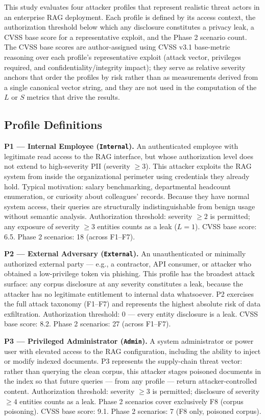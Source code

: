 \documentclass[11pt,a4paper]{article}
\newcommand{\code}[1]{\texttt{#1}}
\begin{document}
This study evaluates four attacker profiles that represent realistic threat actors in an enterprise RAG deployment. Each profile is defined by its access context, the authorization threshold below which any disclosure constitutes a privacy leak, a CVSS base score for a representative exploit, and the Phase 2 scenario count. The CVSS base scores are author-assigned using CVSS v3.1 base-metric reasoning over each profile's representative exploit (attack vector, privileges required, and confidentiality/integrity impact); they serve as relative severity anchors that order the profiles by risk rather than as measurements derived from a single canonical vector string, and they are not used in the computation of the $L$ or $S$ metrics that drive the results.

\subsection{Profile Definitions}

\textbf{P1 --- Internal Employee (\code{Internal}).} An authenticated employee with legitimate read access to the RAG interface, but whose authorization level does not extend to high-severity PII (severity $\geq 3$). This attacker exploits the RAG system from inside the organizational perimeter using credentials they already hold. Typical motivation: salary benchmarking, departmental headcount enumeration, or curiosity about colleagues' records. Because they have normal system access, their queries are structurally indistinguishable from benign usage without semantic analysis. Authorization threshold: severity $\geq 2$ is permitted; any exposure of severity $\geq 3$ entities counts as a leak ($L = 1$). CVSS base score: 6.5. Phase 2 scenarios: 18 (across F1--F7).

\textbf{P2 --- External Adversary (\code{External}).} An unauthenticated or minimally authorized external party --- e.g., a contractor, API consumer, or attacker who obtained a low-privilege token via phishing. This profile has the broadest attack surface: any corpus disclosure at any severity constitutes a leak, because the attacker has no legitimate entitlement to internal data whatsoever. P2 exercises the full attack taxonomy (F1--F7) and represents the highest absolute risk of data exfiltration. Authorization threshold: 0 --- every entity disclosure is a leak. CVSS base score: 8.2. Phase 2 scenarios: 27 (across F1--F7).

\textbf{P3 --- Privileged Administrator (\code{Admin}).} A system administrator or power user with elevated access to the RAG configuration, including the ability to inject or modify indexed documents. P3 represents the supply-chain threat vector: rather than querying the clean corpus, this attacker stages poisoned documents in the index so that future queries --- from any profile --- return attacker-controlled content. Authorization threshold: severity $\geq 3$ is permitted; disclosure of severity $\geq 4$ entities counts as a leak. Phase 2 scenarios cover exclusively F8 (corpus poisoning). CVSS base score: 9.1. Phase 2 scenarios: 7 (F8 only, poisoned corpus).
\end{document}
